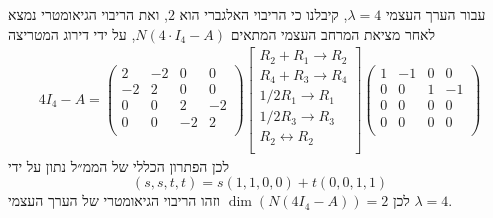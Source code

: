 \documentclass[12pt, a4paper]{article}
\begin{document}
\begin{enumerate}
\begin{enumerate}
עבור הערך העצמי
    $\lambda=4$,
    קיבלנו כי הריבוי האלגברי הוא
    $2$,
    ואת הריבוי הגיאומטרי נמצא לאחר 
    מציאת המרחב העצמי המתאים
    $N(4\cdot I_4-A)$,
    על ידי דירוג המטריצה
    \begin{align*}
     4I_4-A=\begin{pmatrix}
            2&-2&0&0\\
            -2&2&0&0\\
            0&0&2&-2\\
            0&0&-2&2\\
        \end{pmatrix}
     \begin{bmatrix}
         R_2+R_1\rightarrow R_2\\
         R_4+R_3\rightarrow R_4\\
         1/2R_1\rightarrow R_1\\
         1/2R_3\rightarrow R_3\\
         R_2\leftrightarrow R_2\\
     \end{bmatrix}
     \begin{pmatrix}
         1&-1&0&0\\
         0&0&1&-1\\
         0&0&0&0\\
         0&0&0&0\\
     \end{pmatrix}
    \end{align*}
    לכן הפתרון הכללי של הממ״ל נתון על ידי
    $$ (s , s,t,t) =s(1,1,0,0)+t(0,0,1,1)$$
    לכן 
    $\dim(N(4I_4-A))=2$
    וזהו הריבוי הגיאומטרי של הערך העצמי
    $\lambda=4$. 


\end{enumerate}
\end{enumerate}
\end{document}
